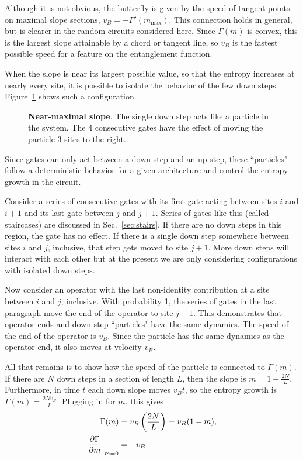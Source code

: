 Although it is not obvious, the butterfly is given by the speed of tangent points on maximal slope sections, $v_B = -\Gamma'(m_{\text{max}})$. This connection holds in general, but is clearer in the random circuits considered here. Since $\Gamma(m)$ is convex, this is the largest slope attainable by a chord or tangent line, so $v_B$ is the fastest possible speed for a feature on the entanglement function.

When the slope is near its largest possible value, so that the entropy increases at nearly every site, it is possible to isolate the behavior of the few down steps. Figure~\ref{fig:particle} shows such a configuration.
\begin{figure}
	\centering
	
	\caption{\textbf{Near-maximal slope}. The single down step acts like a particle in the system. The 4 consecutive gates have the effect of moving the particle 3 sites to the right.}
	\label{fig:particle}
\end{figure}
Since gates can only act between a down step and an up step, these ``particles" follow a deterministic behavior for a given architecture and control the entropy growth in the circuit. 

Consider a series of consecutive gates with its first gate acting between sites $i$ and $i+1$ and its last gate between $j$ and $j+1$. Series of gates like this (called staircases) are discussed in Sec.~\ref{sec:stairs}. If there are no down steps in this region, the gate has no effect. If there is a single down step somewhere between sites $i$ and $j$, inclusive, that step gets moved to site $j+1$. More down steps will interact with each other but at the present we are only considering configurations with isolated down steps. 

Now consider an operator with the last non-identity contribution at a site between $i$ and $j$, inclusive. With probability 1, the series of gates in the last paragraph move the end of the operator to site $j+1$. This demonstrates that operator ends and down step ``particles" have the same dynamics. The speed of the end of the operator is $v_B$. Since the particle has the same dynamics as the operator end, it also moves at velocity $v_B$. 

All that remains is to show how the speed of the particle is connected to $\Gamma(m)$. If there are $N$ down steps in a section of length $L$, then the slope is $m = 1-\frac{2N}{L}$. Furthermore, in time $t$ each down slope moves $v_Bt$, so the entropy growth is $\Gamma(m)=\frac{2Nv_B}{L}$. Plugging in for $m$, this gives
\begin{align}
\Gamma(m) &= v_B\left(\frac{2N}{L}\right) = v_B(1-m),\\
\left.\frac{\partial \Gamma}{\partial m}\right|_{m=0}  &= -v_B.
\end{align}

